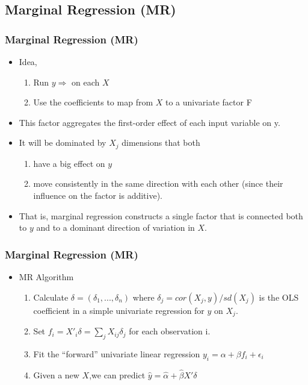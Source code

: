 \documentclass[
  shownotes,
  xcolor={svgnames},
  hyperref={colorlinks,citecolor=DarkBlue,linkcolor=DarkRed,urlcolor=DarkBlue}
  , aspectratio=169]{beamer}
\begin{document}
\subsection{Marginal Regression (MR)}
\begin{frame}[fragile]
\frametitle{Marginal Regression (MR)}

\begin{itemize}
  \item  Idea,
  \begin{enumerate}
    \item Run $y\Rightarrow$ on each $X$
    \item Use the coefficients to map from $X$ to a univariate factor F
  \end{enumerate}
  \medskip
   \item This factor aggregates the first-order effect of each input variable on y. 
  \medskip
\item It will be dominated by $X_j$ dimensions that both 
\begin{enumerate}
\item  have a big effect on $y$ 
\item  move consistently in the same direction with each other (since their influence on the factor is additive). 
\end{enumerate}
\medskip
\item That is, marginal regression constructs a single factor that is connected both to $y$ and to a dominant direction of variation in $X$. 
\end{itemize}

\end{frame}

\begin{frame}[fragile]
\frametitle{Marginal Regression (MR)}

\begin{itemize}
\item MR Algorithm
\medskip
\begin{enumerate}
  \item Calculate $\delta=(\delta_1,...,\delta_n)$ where $\delta_j = cor (X_j, y)/sd(X_j)$ is the OLS coefficient in a simple univariate regression for $y$ on $X_j$. 
  \medskip
  \item Set $f_i = X'_i\delta = \sum_j X_{ij} \delta_j$ for each observation i. 
  \medskip
  \item Fit the “forward” univariate linear regression $y_i = \alpha + \beta f_i + \epsilon_i$
  \medskip
  \item Given a new $X$,we can predict $\hat{y}=\hat{\alpha} + \hat{\beta} X'\delta$
\end{enumerate}

\end{itemize}

\end{frame}
\end{document}
